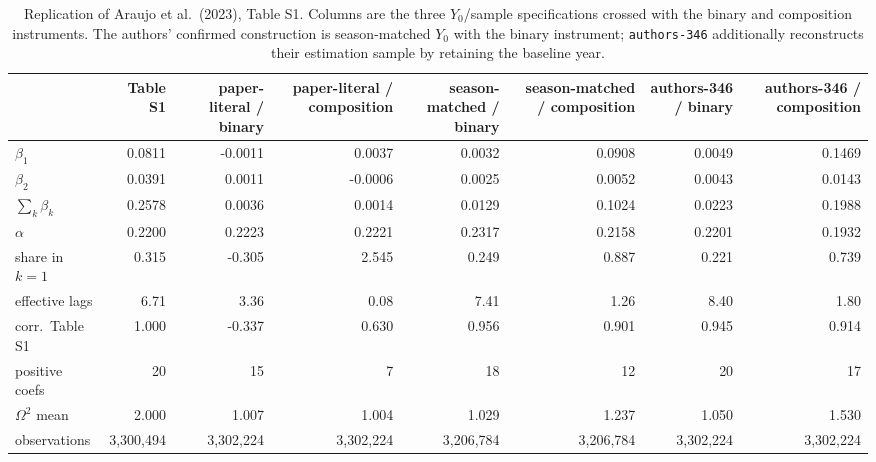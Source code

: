 \begin{table}[htbp]
  \centering\small
  \caption{Replication of Araujo et al.\ (2023), Table S1. Columns are the three $Y_0$/sample specifications crossed with the binary and composition instruments. The authors' confirmed construction is season-matched $Y_0$ with the binary instrument; \texttt{authors-346} additionally reconstructs their estimation sample by retaining the baseline year.}
  \label{tab:replication}
  \begin{tabular}{lrrrrrrr}
    \toprule
     & Table S1 & paper-literal / binary & paper-literal / composition & season-matched / binary & season-matched / composition & authors-346 / binary & authors-346 / composition \\
    \midrule
    $\beta_1$ & 0.0811 & -0.0011 & 0.0037 & 0.0032 & 0.0908 & 0.0049 & 0.1469 \\
    $\beta_2$ & 0.0391 & 0.0011 & -0.0006 & 0.0025 & 0.0052 & 0.0043 & 0.0143 \\
    $\sum_k \beta_k$ & 0.2578 & 0.0036 & 0.0014 & 0.0129 & 0.1024 & 0.0223 & 0.1988 \\
    $\alpha$ & 0.2200 & 0.2223 & 0.2221 & 0.2317 & 0.2158 & 0.2201 & 0.1932 \\
    share in $k=1$ & 0.315 & -0.305 & 2.545 & 0.249 & 0.887 & 0.221 & 0.739 \\
    effective lags & 6.71 & 3.36 & 0.08 & 7.41 & 1.26 & 8.40 & 1.80 \\
    corr.\ Table S1 & 1.000 & -0.337 & 0.630 & 0.956 & 0.901 & 0.945 & 0.914 \\
    positive coefs & 20 & 15 & 7 & 18 & 12 & 20 & 17 \\
    $\Omega^2$ mean & 2.000 & 1.007 & 1.004 & 1.029 & 1.237 & 1.050 & 1.530 \\
    \midrule
    observations & 3,300,494 & 3,302,224 & 3,302,224 & 3,206,784 & 3,206,784 & 3,302,224 & 3,302,224 \\
    \bottomrule
  \end{tabular}
\end{table}
